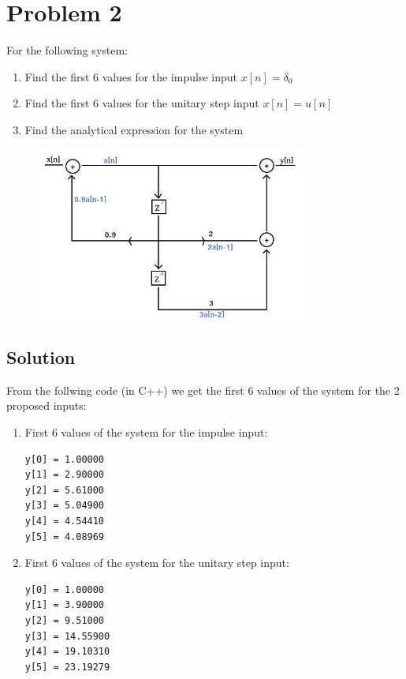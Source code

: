 \section*{Problem 2}

For the following system:
\begin{enumerate}
\item Find the first 6 values for the impulse input $x[n]=\delta_0$
\item Find the first 6 values for the unitary step input $x[n]=u[n]$
\item Find the analytical expression for the system
\end{enumerate} 

\begin{figure}[H]
\caption*{}
\centering
\includegraphics[width=0.8\textwidth]{figs/c7p2.jpg}
\label{fig:c7p2}
\end{figure} 

\subsection*{Solution}
From the follwing code (in C++) we get the first 6 values of the system
for the 2 proposed inputs:

\begin{enumerate}
\setcounter{enumi}{0}
\item First 6 values of the system for the impulse input:
\begin{verbatim}
y[0] = 1.00000
y[1] = 2.90000
y[2] = 5.61000
y[3] = 5.04900
y[4] = 4.54410
y[5] = 4.08969
\end{verbatim}
\end{enumerate} 

\begin{enumerate}
\setcounter{enumi}{1}
\item First 6 values of the system for the unitary step input:
\begin{verbatim}
y[0] = 1.00000
y[1] = 3.90000
y[2] = 9.51000
y[3] = 14.55900
y[4] = 19.10310
y[5] = 23.19279
\end{verbatim}
\end{enumerate} 

